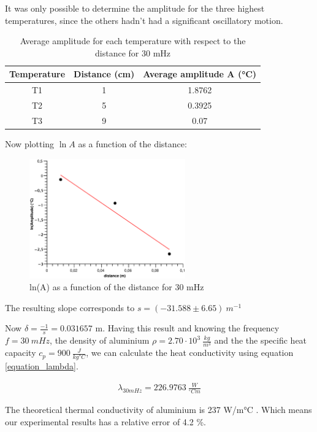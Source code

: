 \documentclass{scrartcl}
\begin{document}
It was only possible to determine the amplitude for the three highest temperatures, since the others hadn't had a significant oscillatory motion.
\begin{table}[H]
    \centering
    \begin{tabular}{c|c|c}
        Temperature & Distance (cm) & Average amplitude A (°C) \\
        \hline
        T1 & 1 & 1.8762 \\
        T2 & 5 & 0.3925 \\
        T3 & 9 & 0.07 
    \end{tabular}
    \caption{Average amplitude for each temperature with respect to the distance for 30 mHz}
    \label{tab:30Hz_A}
\end{table}

Now plotting $\ln{A}$ as a function of the distance: 
\begin{figure}[H]
    \centering
    \includegraphics[width=0.6\textwidth]{ln_30mHz.eps}
    \caption{ln(A) as a function of the distance for 30 mHz}
    \label{fig:ln_30}
\end{figure}

The resulting slope corresponds to $s = (-31.588 \pm 6.65) \ m^{-1} $

Now $\delta = \frac{-1}{s} = 0.031657$ m. 
Having this result and knowing the frequency $f = 30 \ mHz$, the density of aluminium $\rho = 2.70 \cdot 10^3 \ \frac{kg}{m^3}$ and the the specific heat capacity $c_p = 900 \ \frac{J}{kg °C}$, we can calculate the heat conductivity using equation \ref{equation_lambda}.

\begin{align*}
    \lambda_{30 mHz} = 226.9763 \ \frac{W}{^{\circ}Cm}
\end{align*}

The theoretical thermal conductivity of aluminium is 237 W/m°C \cite{Theo_werte}. Which means our experimental results has a relative error of 4.2 \%.
\end{document}
